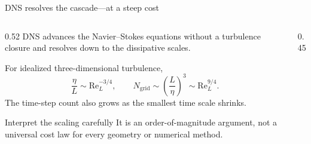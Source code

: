 \documentclass[aspectratio=169,11pt]{beamer}
\newcommand{\Rey}{\mathrm{Re}}
\begin{document}
\begin{frame}{DNS resolves the cascade---at a steep cost}
\begin{columns}[T,onlytextwidth]
\begin{column}{0.52\textwidth}
DNS advances the Navier--Stokes equations without a turbulence closure and resolves down to the dissipative scales.

For idealized three-dimensional turbulence,
\[
  \frac{\eta}{L}\sim \Rey_L^{-3/4},
  \qquad
  N_{\mathrm{grid}}\sim \left(\frac{L}{\eta}\right)^3\sim \Rey_L^{9/4}.
\]
The time-step count also grows as the smallest time scale shrinks.

\begin{block}{Interpret the scaling carefully}
It is an order-of-magnitude argument, not a universal cost law for every geometry or numerical method.
\end{block}
\end{column}
\begin{column}{0.45\textwidth}
\centering
{}
\end{column}
\end{columns}
\end{frame}
\end{document}
